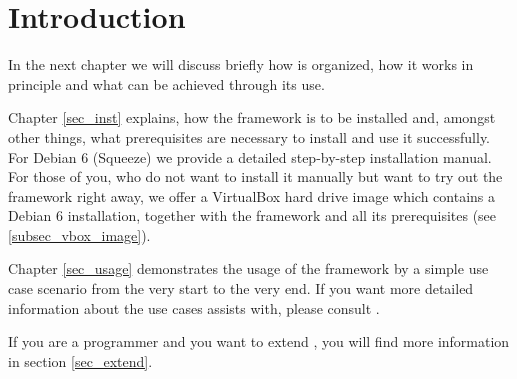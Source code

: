 	\section{Introduction}\label{sec_intro}
	In the next chapter we will discuss briefly how \clusteval is organized, how it works in principle and what can be achieved through its use.
	
	Chapter \ref{sec_inst} explains, how the framework is to be installed and, amongst other things, what prerequisites are necessary to install and use it successfully. For Debian 6 (Squeeze) we provide a detailed step-by-step installation manual. For those of you, who do not want to install it manually but want to try out the framework right away, we offer a VirtualBox hard drive image which contains a Debian 6 installation, together with the framework and all its prerequisites (see \ref{subsec_vbox_image}).
	
	Chapter \ref{sec_usage} demonstrates the usage of the framework by a simple use case scenario from the very start to the very end. If you want more detailed information about the use cases \clusteval assists with, please  consult \cite{wiwie_2013}.
	
	If you are a programmer and you want to extend \clusteval, you will find more information in section \ref{sec_extend}.